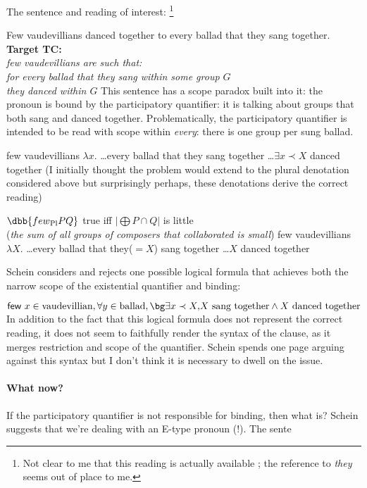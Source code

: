 The sentence and reading of interest:
\footnote{Not clear to me that this reading is actually available ; the reference to \emph{they} seems out of place to me.
}

\pex
\a
Few vaudevillians danced together to every ballad that {\bg they} sang together.
\a
\textbf{Target TC:}\\
\emph{few vaudevillians are such that:}\\
\emph{for every ballad that they sang within some group $G$}\\
\emph{they danced within $G$}
\xe
%
This sentence has a scope paradox built into it: the pronoun is bound by the participatory quantifier: it is talking about groups that both sang and danced together. Problematically, the participatory quantifier is intended to be read with scope within \emph{every}: there is one group per sung ballad.

\ex
few vaudevillians $\lambda x.$ \ldots every ballad that {\bg they} sang together \ldots {\bg $\exists x\prec X$} danced together
\xe
%
(I initially thought the problem would extend to the plural denotation considered above but surprisingly perhaps, these denotations derive the correct reading)

\pex
\a 
$\dbb{few\textsubscript{Pl} P Q}$ true iff $|\bigoplus P\cap Q|$ is little\\
(\emph{the sum of all groups of composers that collaborated is small})
\a 
few vaudevillians $\lambda X.$ \ldots every ballad that {\bg they}($=X$) sang together \ldots {\bg $X$} danced together

\xe
%
Schein considers and rejects one possible logical formula that achieves both the narrow scope of the existential quantifier and binding:

\ex
$
\textsf{few } x\in\text{vaudevillian}, \forall y\in\text{ballad},
{\bg \exists x\prec X,} X\text{ sang together} \wedge X\text{ danced together}
$
\xe
%
In addition to the fact that this logical formula does not represent the correct reading, it does not seem to faithfully render the syntax of the clause, as it merges restriction and scope of the quantifier. Schein spends one page arguing against this syntax but I don't think it is necessary to dwell on the issue.

\paragraph{What now?}
If the participatory quantifier is not responsible for binding, then what is? Schein suggests that we're dealing with an E-type pronoun (!). The sente

